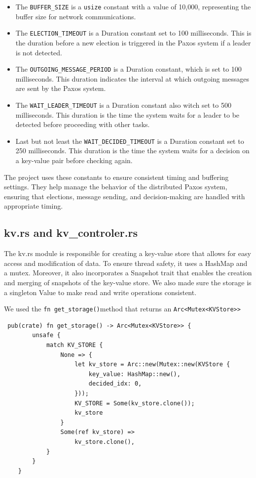 \documentclass[a4paper, 11pt]{article}
\begin{document}
\begin{itemize}
    \item The \verb|BUFFER_SIZE| is a \verb|usize| constant with a value of 10,000, representing the buffer size for network communications.
    \item The \verb|ELECTION_TIMEOUT| is a Duration constant set to 100 milliseconds. This is the duration before a new election is triggered in the Paxos system if a leader is not detected.
    \item The \verb|OUTGOING_MESSAGE_PERIOD| is a Duration constant, which is set to 100 milliseconds. This duration indicates the interval at which outgoing messages are sent by the Paxos system.
    \item The \verb|WAIT_LEADER_TIMEOUT| is a Duration constant also witch set to 500 milliseconds. This duration is the time the system waits for a leader to be detected before proceeding with other tasks.
    \item Last but not least the \verb|WAIT_DECIDED_TIMEOUT| is a Duration constant set to 250 milliseconds. This duration is the time the system waits for a decision on a key-value pair before checking again.
\end{itemize}
\par
The project uses these constants to ensure consistent timing and buffering settings. They help manage the behavior of the distributed Paxos system, ensuring that elections, message sending, and decision-making are handled with appropriate timing.


\subsection{kv.rs and kv\_controler.rs}
The kv.rs module is responsible for creating a key-value store that allows for easy access and modification of data. To ensure thread safety, it uses a HashMap and a mutex. Moreover, it also incorporates a Snapshot trait that enables the creation and merging of snapshots of the key-value store. We also made sure the storage is a singleton Value to make read and write operations consistent.\par
We used the \verb|fn get_storage()|method that returns an \verb|Arc<Mutex<KVStore>>|

\begin{verbatim}
 pub(crate) fn get_storage() -> Arc<Mutex<KVStore>> {
        unsafe {
            match KV_STORE {
                None => {
                    let kv_store = Arc::new(Mutex::new(KVStore {
                        key_value: HashMap::new(),
                        decided_idx: 0,
                    }));
                    KV_STORE = Some(kv_store.clone());
                    kv_store
                }
                Some(ref kv_store) =>
                    kv_store.clone(),
            }
        }
    }
    
\end{verbatim}
\end{document}
